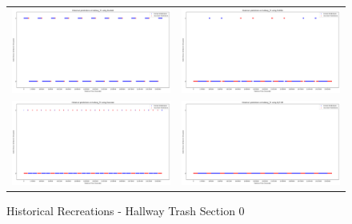 \begin{figure}
  \begin{tabular}{cc}
    {\includegraphics[width = 3in]{images/results/Historical_hallway_T0_Duckett.png}} &
    {\includegraphics[width = 3in]{images/results/Historical_hallway_T0_FreMEn.png}} \\
    {\includegraphics[width = 3in]{images/results/Historical_hallway_T0_Gaussian.png}} &
    {\includegraphics[width = 3in]{images/results/Historical_hallway_T0_HyT-EM.png}} \\
  \end{tabular}
  \caption{Historical Recreations - Hallway Trash Section 0}
\end{figure}\\ \\


